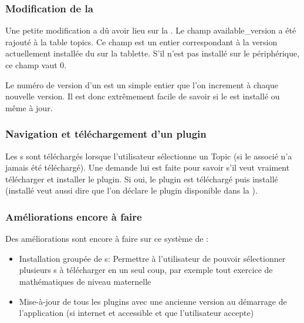 \subsubsection{Modification de la \bdd{}}
Une petite modification a dû avoir lieu sur la \bdd{}. Le champ \og{}available\_version\fg{} a été rajouté à la table \og{}topics\fg{}. Ce champ est un entier correspondant à la version actuellement installée du \plugin{} sur la tablette. S'il n'est pas installé sur le périphérique, ce champ vaut \og{}$0$\fg{}.

Le numéro de version d'un \plugin{} est un simple entier que l'on increment à chaque nouvelle version. Il est donc extrêmement facile de savoir si le \plugin{} est installé ou même à jour.

\subsubsection{Navigation et téléchargement d'un plugin}
Les \plugin s sont téléchargés lorsque l'utilisateur sélectionne un Topic (si le \plugin{} associé n'a jamais été téléchargé). Une demande lui est faite pour savoir s'il veut vraiment télécharger et installer le plugin. 
Si oui, le plugin est téléchargé puis installé (installé veut aussi dire que l'on déclare le plugin disponible dans la \bdd{}).

\subsubsection{Améliorations encore à faire}
Des améliorations sont encore à faire sur ce système de \plugin{}:
\begin{itemize}
    \item Installation groupée de \plugin s:
    \newline Permettre à l'utilisateur de pouvoir sélectionner plusieurs \plugin s à télécharger en un seul coup, par exemple tout exercice de mathématiques de niveau maternelle
    \item Mise-à-jour de tous les plugins avec une ancienne version au démarrage de l'application (si internet et accessible et que l'utilisateur accepte)
\end{itemize}
